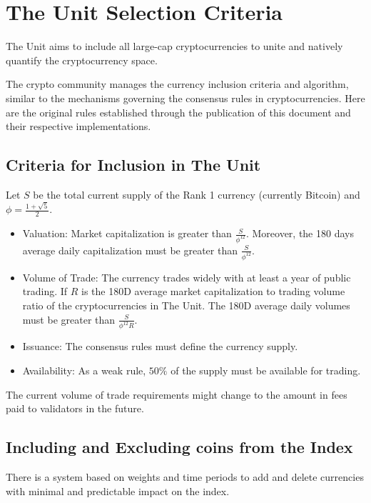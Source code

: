 \documentclass[12pt]{article}
\begin{document}
\section{The Unit Selection Criteria}

The Unit aims to include all large-cap cryptocurrencies to unite and natively quantify the cryptocurrency space. 

The crypto community manages the currency inclusion criteria and algorithm, similar to the mechanisms governing the consensus rules in cryptocurrencies. Here are the original rules established through the publication of this document and their respective implementations. 

\subsection{Criteria for Inclusion in The Unit}

Let $S$ be the total current supply of the Rank 1 currency (currently Bitcoin) and $\displaystyle{\phi =\frac{1+\sqrt{5}}{2}}$.

\begin{itemize}

\item Valuation: Market capitalization is greater than $\displaystyle{\frac{S}{\phi^{12}}}$. Moreover, the 180 days average daily capitalization must be greater than $\displaystyle{\frac{S}{\phi^{12}}}$.
\item Volume of Trade: The currency trades widely with at least a year of public trading. If $R$ is the 180D average market capitalization to trading volume ratio of the cryptocurrencies in The Unit. The 180D average daily volumes must be greater than $\displaystyle{\frac{S}{\phi^{12}R}}$.
\item Issuance: The consensus rules must define the currency supply.
\item Availability: As a weak rule, $50\%$ of the supply must be available for trading.

\end{itemize}

The current volume of trade requirements might change to the amount in fees paid to validators in the future.

\subsection{Including and Excluding coins from the Index}

There is a system based on weights and time periods to add and delete currencies with minimal and predictable impact on the index.
\end{document}
